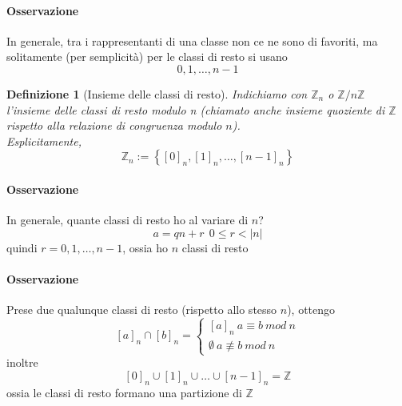 \documentclass[a4paper]{report}
\newtheorem{definition}{Definizione}
\begin{document}
\paragraph{Osservazione}
In generale, tra i rappresentanti di una classe non ce ne sono di favoriti, ma solitamente (per semplicità) per le classi di resto si usano
\[
    0,1,\dots,n-1
\]
\begin{definition}[Insieme delle classi di resto]
    Indichiamo con $\mathbb{Z}_n$ o $\mathbb{Z}/n\mathbb{Z}$ l'insieme delle classi di resto modulo n (chiamato anche insieme quoziente di $\mathbb{Z}$ rispetto alla relazione di congruenza modulo $n$).\\
    Esplicitamente,
    \[
        \mathbb{Z}_n:=\left\{[0]_n,[1]_n,\dots,[n-1]_n\right\}
    \]
\end{definition}
\paragraph{Osservazione} In generale, quante classi di resto ho al variare di $n$?
\[
    a=qn+r\ \ 0\leq r<|n|
\]
quindi $r=0,1,\dots,n-1$, ossia ho $n$ classi di resto
\paragraph{Osservazione}
Prese due qualunque classi di resto (rispetto allo stesso $n$), ottengo
\[
    [a]_n\cap[b]_n=\begin{cases}
        [a]_n\  a\equiv b\ mod\ n \\
        \emptyset\  a\not\equiv b\ mod\ n
    \end{cases}
\]
inoltre
\[
    [0]_n\cup[1]_n\cup\dots\cup[n-1]_n=\mathbb{Z}
\]
ossia le classi di resto formano una partizione di $\mathbb{Z}$
\end{document}
